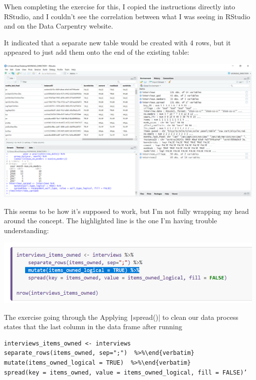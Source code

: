 \documentclass{article}
\begin{document}
{\item When completing the exercise for this, I copied the instructions directly into RStudio, and I couldn’t see the correlation between what I was seeing in RStudio and on the Data Carpentry website.
\item It indicated that a separate new table would be created with 4 rows, but it appeared to just add them onto the end of the existing table:

\includegraphics[width=1.0\textwidth]{rstudio_22.PNG}

This seems to be how it’s supposed to work, but I’m not fully wrapping my head around the concept. The highlighted line is the one I’m having trouble understanding:

\includegraphics[width=1.0\textwidth]{rstudio_23.PNG}}

{\item The exercise going through the Applying \texttt|spread()| to clean our data process states that the last column in the data frame after running }

\begin{verbatim}
interviews_items_owned <- interviews
separate_rows(items_owned, sep=";")  %>%\end{verbatim}
mutate(items_owned_logical = TRUE)  %
spread(key = items_owned, value = items_owned_logical, fill = FALSE)’
\end{verbatim}
\end{document}
